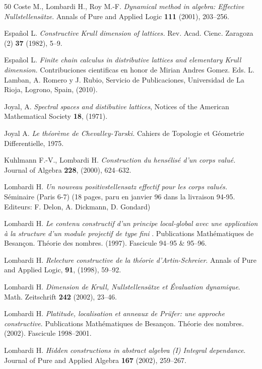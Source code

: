 \begin{thebibliography}{50}
 {\sc Coste M., Lombardi H., Roy M.-F.} {\it  Dynamical method in
algebra: Effective Nullstellensätze}. Annals of
Pure and Applied Logic {\bf 111} (2001),
203--256.


 {\sc Espa\~nol L.} {\em Constructive Krull dimension of 
lattices.}
Rev. Acad. Cienc. Zaragoza (2) {\bf 37} (1982), 5--9.

 {\sc Espa\~nol L.} \emph{Finite chain calculus in distributive lattices and elementary Krull dimension.} Contribuciones cientificas en honor de Mirian Andres Gomez.
Eds. L. Lamban, A. Romero y J. Rubio, 
Servicio de Publicaciones, Universidad de La Rioja, Logrono, Spain, (2010).

    {\sc Joyal, A.}
\emph{Spectral spaces and distibutive lattices},
{Notices of the American Mathematical Society}
{\bf 18}, (1971).

 {\sc Joyal A.} {\em Le théorème de Chevalley-Tarski.}
Cahiers de Topologie et Géometrie Differentielle, 1975.

 {\sc Kuhlmann F.-V., Lombardi H.}
{\it Construction du hensélisé d'un corps valué.}
Journal of Algebra  {\bf 228}, (2000),
624--632.

 {\sc Lombardi H.}
{\it Un nouveau positiv\-stellen\-satz effectif pour les corps 
valués.}
Séminaire  (Paris 6-7)
(18 pages, paru en janvier 96 dans la livraison 94-95.
Editeurs: F. Delon, A. Dickmann, D. Gondard)

 {\sc Lombardi H.}   {\it Le contenu constructif d'un principe
local-global avec une
application à la structure d'un module projectif de type fini }.
Publications Mathématiques
de Besançon. Théorie des nombres. (1997).
Fascicule  94--95 \& 95--96.

 {\sc Lombardi H.} {\it  Relecture constructive de la théorie
d'Artin-Schreier}. Annals of Pure and Applied Logic,  {\bf 91}, (1998),
59--92.

  {\sc Lombardi H.} {\em Dimension de Krull, Nullstellensätze
 et \'Evaluation dynamique}.  
Math. Zeitschrift {\bf 242} (2002), 23--46.

 {\sc Lombardi H.} {\it Platitude, localisation et anneaux de
Prüfer: une approche constructive}. Publications Mathématiques
de Besançon. Théorie des nombres. (2002).
Fascicule  1998--2001.


   {\sc Lombardi H.}
{\em Hidden constructions in abstract algebra (I) Integral
dependance}. Journal of Pure and Applied Algebra {\bf 167} (2002), 259--267.


\end{thebibliography}
